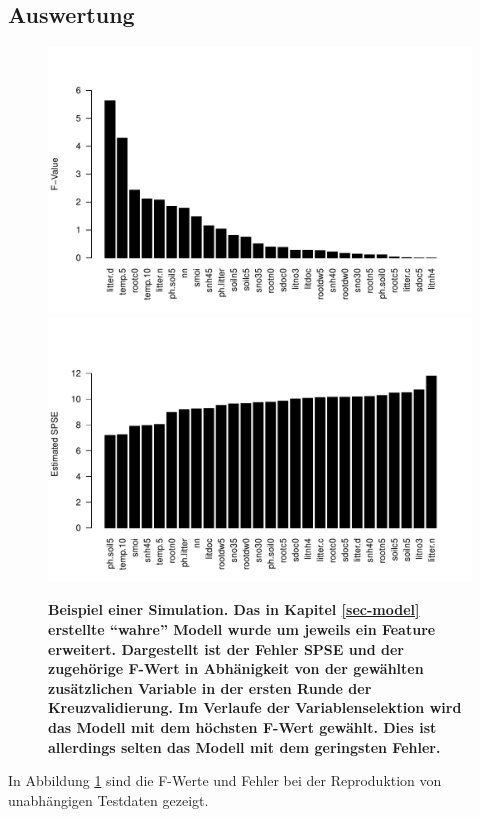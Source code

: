 \subsection{Auswertung}
\begin{figure}[htbp]
	\centering
	\includegraphics[width=\textwidth]{fig/simul/simul-f.pdf}
	\includegraphics[width=\textwidth]{fig/simul/simul-spse.pdf}
	\caption{\bf{Beispiel einer Simulation.} 
		Das in Kapitel \ref{sec-model} erstellte "`wahre"' Modell wurde um jeweils ein Feature erweitert.
		Dargestellt ist der Fehler \bf{SPSE} und der zugehörige \bf{F-Wert} in Abhänigkeit von der gewählten zusätzlichen Variable in der ersten Runde der Kreuzvalidierung.
		Im Verlaufe der Variablenselektion wird das Modell mit dem höchsten F-Wert gewählt.
		Dies ist allerdings selten das Modell mit dem geringsten Fehler.
	}
	\label{fig-simul-f-spse}
\end{figure}
In Abbildung \ref{fig-simul-f-spse} sind die F-Werte und Fehler bei der Reproduktion von unabhängigen Testdaten gezeigt.
